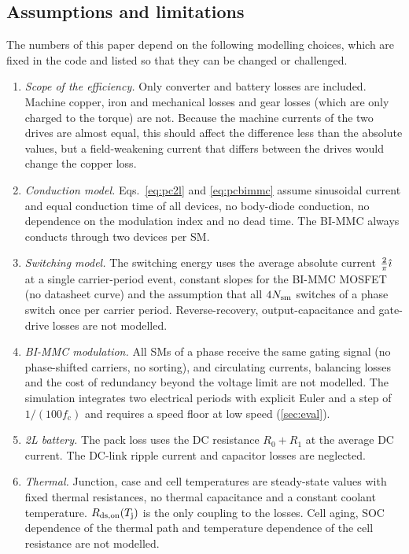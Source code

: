 \subsection{Assumptions and limitations}
The numbers of this paper depend on the following modelling choices, which are fixed in the code and listed so that they can be changed or challenged.
\begin{enumerate}
\item \emph{Scope of the efficiency.} Only converter and battery losses are included. Machine copper, iron and mechanical losses and gear losses (which are only charged to the torque) are not. Because the machine currents of the two drives are almost equal, this should affect the difference less than the absolute values, but a field-weakening current that differs between the drives would change the copper loss.
\item \emph{Conduction model.} Eqs.~\eqref{eq:pc2l} and \eqref{eq:pcbimmc} assume sinusoidal current and equal conduction time of all devices, no body-diode conduction, no dependence on the modulation index and no dead time. The BI-MMC always conducts through two devices per SM.
\item \emph{Switching model.} The switching energy uses the average absolute current $\tfrac2\pi\hat\imath$ at a single carrier-period event, constant slopes for the BI-MMC MOSFET (no datasheet curve) and the assumption that all $4N_\mathrm{sm}$ switches of a phase switch once per carrier period. Reverse-recovery, output-capacitance and gate-drive losses are not modelled.
\item \emph{BI-MMC modulation.} All SMs of a phase receive the same gating signal (no phase-shifted carriers, no sorting), and circulating currents, balancing losses and the cost of redundancy beyond the voltage limit are not modelled. The simulation integrates two electrical periods with explicit Euler and a step of $1/(100f_\mathrm{c})$ and requires a speed floor at low speed (\cref{sec:eval}).
\item \emph{2L battery.} The pack loss uses the DC resistance $R_0+R_1$ at the average DC current. The DC-link ripple current and capacitor losses are neglected.
\item \emph{Thermal.} Junction, case and cell temperatures are steady-state values with fixed thermal resistances, no thermal capacitance and a constant coolant temperature. $R_\mathrm{ds,on}(T_\mathrm{j})$ is the only coupling to the losses. Cell aging, SOC dependence of the thermal path and temperature dependence of the cell resistance are not modelled.

\end{enumerate}

